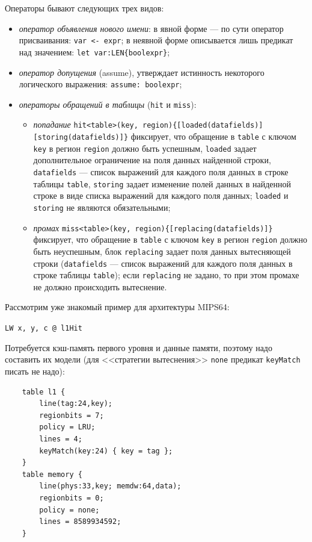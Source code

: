 Операторы бывают следующих трех видов:
\begin{itemize}
    \item \emph{оператор объявления нового имени}: в явной форме --- по сути
оператор присваивания: \texttt{var <- expr}; в неявной форме описывается лишь
предикат над значением: \texttt{let var:LEN\{boolexpr\}};
    \item \emph{оператор допущения} (assume), утверждает истинность некоторого
логического выражения: \texttt{assume: boolexpr};
    \item \emph{операторы обращений в таблицы} (\texttt{hit} и \texttt{miss}):
        \begin{itemize}
            \item \emph{попадание} \texttt{hit<table>(key,
region)\{[loaded(datafields)]}\\\texttt{[storing(datafields)]\}} фиксирует, что
обращение в \texttt{table} с ключом \texttt{key} в регион \texttt{region} должно
быть успешным, \texttt{loaded} задает дополнительное ограничение на поля данных найденной строки, \\ \texttt{datafields} --- список выражений для каждого поля данных в строке таблицы \texttt{table}, \texttt{storing} задает изменение полей данных в
найденной строке в виде списка выражений для каждого поля данных; \texttt{loaded} и \texttt{storing} не являются обязательными;
            \item \emph{промах} \texttt{miss<table>(key,
region)\{[replacing(datafields)]\}}\\фиксирует, что обращение в \texttt{table} с
ключом \texttt{key} в регион \texttt{region} должно быть неуспешным, блок
\texttt{replacing} задает поля данных вытесняющей строки (\texttt{datafields}
--- список выражений для каждого поля данных в строке таблицы \texttt{table});
если \texttt{replacing} не задано, то при этом промахе не должно происходить
вытеснение.
        \end{itemize}
\end{itemize}


Рассмотрим уже знакомый пример для архитектуры MIPS64:

\texttt{LW x, y, c @ l1Hit}

Потребуется кэш-память первого уровня и данные памяти, поэтому надо составить их
модели (для <<стратегии вытеснения>> \texttt{none} предикат \texttt{keyMatch}
писать не надо):
\begin{verbatim}
    table l1 {
        line(tag:24,key);
        regionbits = 7;
        policy = LRU;
        lines = 4;
        keyMatch(key:24) { key = tag };
    }
    table memory {
        line(phys:33,key; memdw:64,data);
        regionbits = 0;
        policy = none;
        lines = 8589934592;
    }
\end{verbatim}

